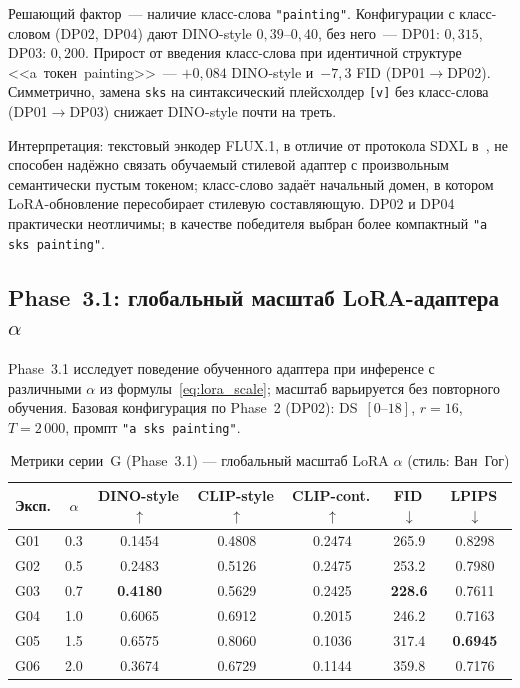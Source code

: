 Решающий фактор~--- наличие класс-слова \texttt{"painting"}. Конфигурации с класс-словом (DP02, DP04) дают DINO-style $0{,}39\text{--}0{,}40$, без него~--- DP01: $0{,}315$, DP03: $0{,}200$. Прирост от введения класс-слова при идентичной структуре <<a~\textlangle токен\textrangle~painting>>~--- $+0{,}084$ DINO-style и~$-7{,}3$ FID (DP01$\to$DP02). Симметрично, замена \texttt{sks} на синтаксический плейсхолдер \texttt{[v]} без класс-слова (DP01$\to$DP03) снижает DINO-style почти на треть.

Интерпретация: текстовый энкодер FLUX.1, в отличие от протокола SDXL в~\cite{frenkel2024blora}, не способен надёжно связать обучаемый стилевой адаптер с произвольным семантически пустым токеном; класс-слово задаёт начальный домен, в котором LoRA-обновление пересобирает стилевую составляющую. DP02 и DP04 практически неотличимы; в качестве победителя выбран более компактный \texttt{"a sks painting"}.

\subsection{Phase~3.1: глобальный масштаб LoRA-адаптера $\alpha$}
\label{sec:results_phase3_g}

Phase~3.1 исследует поведение обученного адаптера при инференсе с различными $\alpha$ из формулы~\eqref{eq:lora_scale}; масштаб варьируется без повторного обучения. Базовая конфигурация по Phase~2 (DP02): DS~$[0\text{--}18]$, $r{=}16$, $T{=}2\,000$, промпт \texttt{"a sks painting"}.

\begin{table}[h]
\centering
\caption{Метрики серии~G (Phase~3.1) --- глобальный масштаб LoRA $\alpha$ (стиль: Ван~Гог)}
\label{tab:phase3_alpha_metrics}
\begingroup\small
\begin{tabular}{lcccccc}
\hline
\textbf{Эксп.} & \textbf{$\alpha$} & \textbf{DINO-style\,$\uparrow$} & \textbf{CLIP-style\,$\uparrow$} & \textbf{CLIP-cont.\,$\uparrow$} & \textbf{FID\,$\downarrow$} & \textbf{LPIPS\,$\downarrow$} \\
\hline
G01 & 0.3 & 0.1454          & 0.4808          & 0.2474          & 265.9          & 0.8298          \\
G02 & 0.5 & 0.2483          & 0.5126          & 0.2475          & 253.2          & 0.7980          \\
G03 & 0.7 & \textbf{0.4180} & 0.5629          & 0.2425          & \textbf{228.6} & 0.7611          \\
G04 & 1.0 & 0.6065          & 0.6912          & 0.2015          & 246.2          & 0.7163          \\
G05 & 1.5 & 0.6575          & 0.8060          & 0.1036          & 317.4          & \textbf{0.6945} \\
G06 & 2.0 & 0.3674          & 0.6729          & 0.1144          & 359.8          & 0.7176          \\
\hline
\end{tabular}\endgroup
\end{table}

